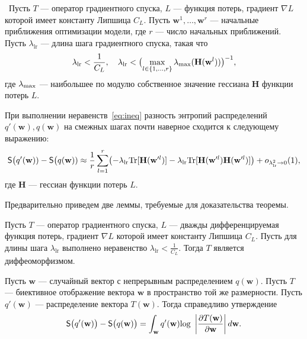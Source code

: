 \begin{theorem}~Пусть $T$ --- оператор градиентного спуска,
 $L$ --- функция потерь, градиент $\nabla L$ которой имеет константу Липшица $C_L$.  Пусть $\mathbf{w}^1,\dots,\mathbf{w}^r$ ---  начальные приближения оптимизации модели, где $r$ --- число начальных приближений. Пусть $\lambda_{\text{lr}}$ --- длина шага градиентного спуска, такая что
\begin{equation}
\label{eq:ineq}
\lambda_{\text{lr}}<\frac{1}{C_L}, \quad \lambda_{\text{lr}} < \bigl(\max_{l \in \{1,\dots,r\}}\lambda_\textnormal{max} (\mathbf{H}(\mathbf{w}^l))\bigr)^{-1}, 
\end{equation}
где $\lambda_\textnormal{max}$ --- наибольшее по модулю собственное значение гессиана  $\mathbf{H}$ функции потерь $L$.

При выполнении неравенств~\eqref{eq:ineq} разность энтропий распределений $q'(\mathbf{w}), q(\mathbf{w})$ на смежных шагах почти наверное сходится к следующему выражению: 
\begin{equation}
\label{eq:entropy}
	\mathsf{S}\bigl(q'(\mathbf{w})) -  \mathsf{S}\bigl(q(\mathbf{w}))  \approx  \frac{1}{r}\sum_{l=1}^r \bigl(-\lambda_{\text{lr}} \textnormal{Tr}[\mathbf{H}(\mathbf{w}'^l)] - \lambda_{\text{lr}} \textnormal{Tr}[\mathbf{H}(\mathbf{w}'^l)\mathbf{H}(\mathbf{w}'^l)]  \bigr) + o_{\lambda_{\text{lr}}^2 \to 0}(1),
\end{equation}
где $\mathbf{H}$ --- гессиан функции потерь $L$.
\end{theorem}

Предварительно приведем две леммы, требуемые для доказательства теоремы.
\begin{lemma} Пусть $T$ --- оператор градиентного спуска, $L$ --- дважды дифференцируемая функция потерь, градиент $\nabla L$ которой имеет константу Липшица $C_L$.  Пусть для длины шага $\lambda_{\text{lr}}$ выполнено неравенство 
$
	\lambda_{\text{lr}}<\frac{1}{C_L}.
$
Тогда $T$ является диффеоморфизмом.
\end{lemma}

\begin{lemma} Пусть $\mathbf{w}$ --- случайный вектор с непрерывным распределением $q(\mathbf{w})$. Пусть $T$ --- биективное отображение вектора $\mathbf{w}$ в пространство той же размерности. Пусть $q'(\mathbf{w})$ --- распределение вектора $T(\mathbf{w})$. Тогда справедливо утверждение
\begin{equation}
\label{eq:entropy_biject}
	\mathsf{S}\bigl(q'(\mathbf{w})\bigr) -  \mathsf{S}\bigl(q(\mathbf{w})\bigr)  = \int_\mathbf{w}  q'(\mathbf{w}) \textnormal{log}~\left|\frac{\partial{T(\mathbf{w})}}{\partial{\mathbf{w}}}\right| d\mathbf{w}.
\end{equation}
\end{lemma}


